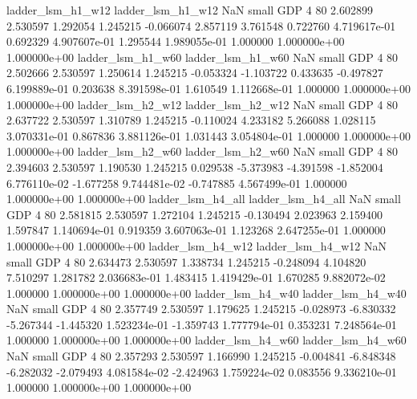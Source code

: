        ladder_lsm_h1_w12        ladder_lsm_h1_w12                   NaN      small      GDP                 4 80 2.602899       2.530597 1.292054       1.245215   -0.066074      2.857119      3.761548     0.722760   4.719617e-01  0.692329 4.907607e-01     1.295544   1.989055e-01            1.000000    1.000000e+00        1.000000e+00
       ladder_lsm_h1_w60        ladder_lsm_h1_w60                   NaN      small      GDP                 4 80 2.502666       2.530597 1.250614       1.245215   -0.053324     -1.103722      0.433635    -0.497827   6.199889e-01  0.203638 8.391598e-01     1.610549   1.112668e-01            1.000000    1.000000e+00        1.000000e+00
       ladder_lsm_h2_w12        ladder_lsm_h2_w12                   NaN      small      GDP                 4 80 2.637722       2.530597 1.310789       1.245215   -0.110024      4.233182      5.266088     1.028115   3.070331e-01  0.867836 3.881126e-01     1.031443   3.054804e-01            1.000000    1.000000e+00        1.000000e+00
       ladder_lsm_h2_w60        ladder_lsm_h2_w60                   NaN      small      GDP                 4 80 2.394603       2.530597 1.190530       1.245215    0.029538     -5.373983     -4.391598    -1.852004   6.776110e-02 -1.677258 9.744481e-02    -0.747885   4.567499e-01            1.000000    1.000000e+00        1.000000e+00
       ladder_lsm_h4_all        ladder_lsm_h4_all                   NaN      small      GDP                 4 80 2.581815       2.530597 1.272104       1.245215   -0.130494      2.023963      2.159400     1.597847   1.140694e-01  0.919359 3.607063e-01     1.123268   2.647255e-01            1.000000    1.000000e+00        1.000000e+00
       ladder_lsm_h4_w12        ladder_lsm_h4_w12                   NaN      small      GDP                 4 80 2.634473       2.530597 1.338734       1.245215   -0.248094      4.104820      7.510297     1.281782   2.036683e-01  1.483415 1.419429e-01     1.670285   9.882072e-02            1.000000    1.000000e+00        1.000000e+00
       ladder_lsm_h4_w40        ladder_lsm_h4_w40                   NaN      small      GDP                 4 80 2.357749       2.530597 1.179625       1.245215   -0.028973     -6.830332     -5.267344    -1.445320   1.523234e-01 -1.359743 1.777794e-01     0.353231   7.248564e-01            1.000000    1.000000e+00        1.000000e+00
       ladder_lsm_h4_w60        ladder_lsm_h4_w60                   NaN      small      GDP                 4 80 2.357293       2.530597 1.166990       1.245215   -0.004841     -6.848348     -6.282032    -2.079493   4.081584e-02 -2.424963 1.759224e-02     0.083556   9.336210e-01            1.000000    1.000000e+00        1.000000e+00
